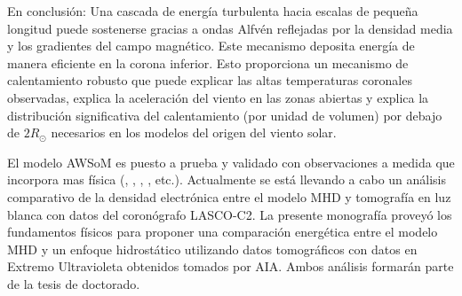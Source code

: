 \documentclass[a4paper,11pt]{report}
\begin{document}
En conclusión:
Una cascada de energía turbulenta hacia escalas de pequeña longitud puede sostenerse gracias a ondas Alfvén reflejadas por la densidad media y los gradientes del campo magnético. Este mecanismo deposita energía de manera eficiente en la corona inferior. Esto proporciona un mecanismo de calentamiento robusto que puede explicar las altas temperaturas coronales observadas, explica la aceleración del viento en las zonas abiertas y explica la distribución significativa del calentamiento (por unidad de volumen) por debajo de $2R_\odot$ necesarios en los modelos del origen del viento solar.


El modelo AWSoM es puesto a prueba y validado con observaciones a medida que incorpora mas física (\citet{oran_2015}, \citet{sachdeva_2019}, \citet{lloveras_2020}, \citet{lloveras_2020BAAA}, etc.). Actualmente se está llevando a cabo un análisis comparativo de la densidad electrónica entre el modelo MHD y tomografía en luz blanca con datos del coronógrafo LASCO-C2. La presente monografía proveyó los fundamentos físicos para proponer una comparación energética entre el modelo MHD y un enfoque hidrostático utilizando datos tomográficos con datos en Extremo Ultravioleta obtenidos tomados por AIA. Ambos análisis formarán parte de la tesis de doctorado. 





\end{document}
